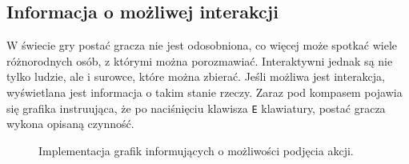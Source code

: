 \subsection{Informacja o możliwej interakcji}
W świecie gry postać gracza nie jest odosobniona, co więcej może spotkać wiele różnorodnych osób, z którymi można porozmawiać. Interaktywni
jednak są nie tylko ludzie, ale i surowce, które można zbierać. Jeśli możliwa jest interakcja,  wyświetlana jest informacja o takim stanie
 rzeczy. Zaraz pod kompasem pojawia się grafika instruująca, że po naciśnięciu klawisza \texttt{E} klawiatury, postać gracza wykona opisaną czynność.
 \begin{figure}[htbp]
    \centering
    \qquad
    \caption{Implementacja grafik informujących o możliwości podjęcia akcji.}
\end{figure}
\FloatBarrier


